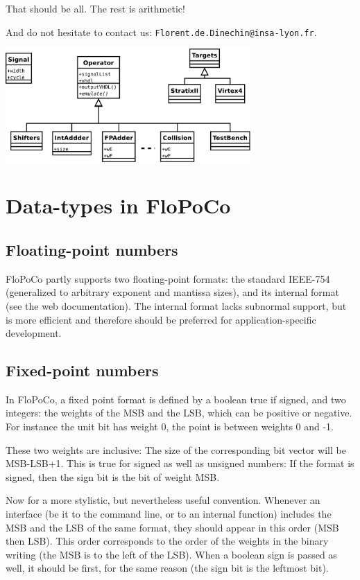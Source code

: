 \documentclass{article}
\begin{document}
That should be all. The rest is arithmetic!

And do not hesitate to contact us: \texttt{Florent.de.Dinechin@insa-lyon.fr}.

\begin{center}
  \includegraphics[width=0.7\textwidth]{../Figures/FloPoCoClasses.pdf}        
\end{center}


\section{Data-types in FloPoCo\label{sec:data-types}}

\subsection{Floating-point numbers}

FloPoCo partly supports two floating-point formats: the standard IEEE-754 (generalized to arbitrary exponent and mantissa sizes), and its internal format (see the web documentation).
The internal format lacks subnormal support, but is more efficient and therefore should be preferred for application-specific development.


\subsection{Fixed-point numbers}
In FloPoCo, a fixed point format is defined by a boolean true if signed, and two integers: the weights of the MSB and the LSB, which can be positive or negative. 
For instance the unit bit has weight 0, the point is between weights 0 and -1. 

These two weights are inclusive: The size of the corresponding bit vector will be MSB-LSB+1.
This is true for signed as well as unsigned numbers: If the format is signed, then the sign bit is the bit of weight MSB.


Now for a more stylistic, but nevertheless useful convention. Whenever an interface (be it to the command line, or to an internal function) includes the MSB and the LSB of the same format, they should appear in this order (MSB then LSB). This order corresponds to the order of the weights in the binary writing (the MSB is to the left of the LSB). 
When a boolean sign is passed as well, it should be first, for the same reason (the sign bit is the leftmost bit).
\end{document}
